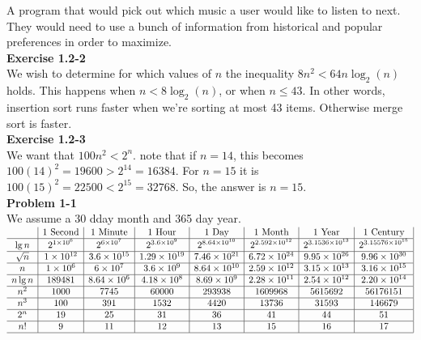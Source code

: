 \documentclass{article}
\begin{document}
A program that would pick out which music a user would like to listen to next. They would need to use a bunch of information from historical and popular preferences in order to maximize. \\

\noindent\textbf{Exercise 1.2-2}\\

We wish to determine for which values of $n$ the inequality $8n^2 < 64n \log_2(n)$ holds.  This happens when $n < 8 \log_2(n)$, or when $n \leq 43$.  In other words, insertion sort runs faster when we're sorting at most 43 items.  Otherwise merge sort is faster. \\

\noindent\textbf{Exercise 1.2-3} \\

We want that $100n^2<2^n$. note that if $n=14$, this becomes $100(14)^2=19600 > 2^14  = 16384$. For $n=15$ it is $100(15)^2 = 22500 < 2^{15} = 32768$. So, the answer is $n=15$. \\

\noindent\textbf{Problem 1-1} \\

We assume a 30 dday month and 365 day year. \\

$
\begin{array}{c|c|c|c|c|c|c|c|}
&1 \mbox{ Second}&1 \mbox{ Minute} &1 \mbox{ Hour}&1 \mbox{ Day}&1 \mbox{ Month}&1 \mbox{ Year}&1 \mbox{ Century}\\
\hline
\lg n& 2^{1\times10^6}&2^{6\times10^7} &2^{3.6\times10^9} &2^{8.64\times10^{10}} &2^{2.592\times10^{12}} & 2^{3.1536\times10^{13} } & 2^{3.15576\times10^{15}} \\
\hline
\sqrt{n} &1\times10^{12} &3.6\times10^{15} &1.29\times10^{19} & 7.46\times10^{21}& 6.72\times10^{24}& 9.95\times10^{26}&9.96\times10^{30} \\
\hline
n &1\times10^6&6\times10^7 &3.6\times10^9 &8.64\times10^{10} &2.59\times10^{12}  & 3.15\times10^{13} & 3.16\times10^{15}\\
\hline
n \lg n & 189481& 8.64\times10^6&4.18\times10^8 &8.69\times10^9 &2.28\times10^{11} & 2.54\times10^{12}&2.20\times10^{14} \\
\hline
n^2 &1000 & 7745& 60000&293938 & 1609968& 5615692& 56176151\\
\hline
n^3 & 100& 391& 1532& 4420& 13736&31593 &146679 \\
\hline
2^n & 19 & 25& 31&36 &41 & 44 &51 \\
\hline
n! & 9&11 & 12& 13& 15& 16& 17\\
\hline
\end{array}
$
\end{document}
